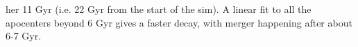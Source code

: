 her 11 Gyr (i.e. 22 Gyr from the start of the sim). A linear fit to all the apocenters beyond 6 Gyr gives a faster decay, with merger happening after about 6-7 Gyr.


